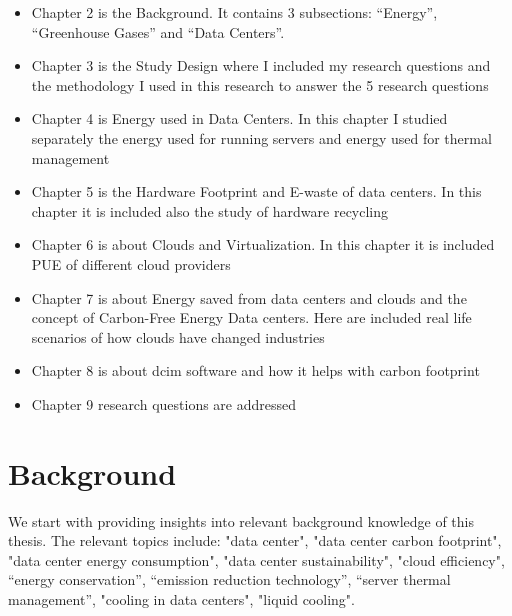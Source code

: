 \documentclass[
  a4paper,  %
  twoside,  %
  bibliography=totoc,
  headsepline,
  cleardoublepage=empty,
  parskip=half,
  draft=false
]{scrbook}
\begin{document}


\begin{itemize}
	\item Chapter 2 is the Background. It contains 3 subsections: \enquote{Energy}, \enquote{Greenhouse Gases} and \enquote{Data Centers}.
	\item Chapter 3 is the Study Design where I included my research questions and the methodology I used in this research to answer the 5 research questions
	\item Chapter 4 is Energy used in Data Centers. In this chapter I studied separately the energy used for running servers and energy used for thermal management
	\item Chapter 5 is the Hardware Footprint and E-waste of data centers. In this chapter it is included also the study of hardware recycling
	\item Chapter 6 is about Clouds and Virtualization. In this chapter it is included PUE of different cloud providers
	\item Chapter 7 is about Energy saved from data centers and clouds and the concept of Carbon-Free Energy Data centers. Here are included real life scenarios of how clouds have changed industries
	\item Chapter 8 is about \gls{dcim} software and how it helps with carbon footprint
	\item Chapter 9 research questions are addressed 
\end{itemize}



\chapter{Background}

We start with providing insights into relevant background knowledge of this thesis. The relevant topics include: "data center", "data center carbon footprint", "data center energy consumption", "data center sustainability", "cloud efficiency", \enquote{energy conservation}, \enquote{emission reduction technology}, \enquote{server thermal management}, "cooling in data centers", "liquid cooling". 
\end{document}
